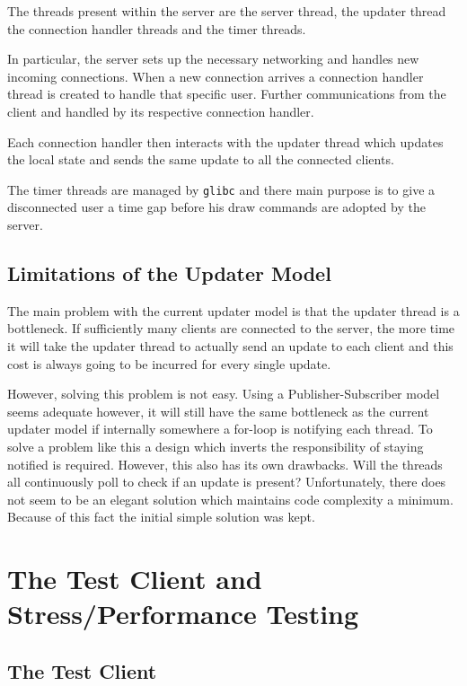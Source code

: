\documentclass[article]{uom-coursework}
\begin{document}
The threads present within the server are the server thread, the
updater thread the connection handler threads and the timer
threads.

In particular, the server sets up the necessary networking and handles
new incoming connections. When a new connection arrives a
connection handler thread is created to handle that specific
user. Further communications from the client and handled by its
respective connection handler.

Each connection handler then interacts with the updater thread
which updates the local state and sends the same update to all
the connected clients.

The timer threads are managed by \texttt{glibc} and there main
purpose is to give a disconnected user a time gap before his
draw commands are adopted by the server.

\subsection{Limitations of the Updater Model}

The main problem with the current updater model is that the
updater thread is a bottleneck. If sufficiently many clients are
connected to the server, the more time it will take the updater
thread to actually send an update to each client and this cost
is always going to be incurred for every single update.

However, solving this problem is not easy. Using a
Publisher-Subscriber model seems adequate however, it will still
have the same bottleneck as the current updater model if
internally somewhere a for-loop is notifying each thread. To
solve a problem like this a design which inverts the
responsibility of staying notified is required. However, this
also has its own drawbacks. Will the threads all continuously
poll to check if an update is present? Unfortunately, there does
not seem to be an elegant solution which maintains code
complexity a minimum. Because of this fact the initial simple
solution was kept.

\section{The Test Client and Stress/Performance Testing}\label{sec:stresstesting}

\subsection{The Test Client}
\end{document}

